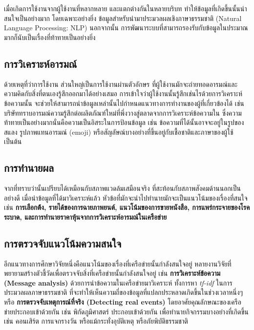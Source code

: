 \section{\SDA}

เมื่อเกิดการใช้งานจากผู้ใช้งานที่หลากหลาย และแตกต่างกันในหลายบริบท 
ทำให้ข้อมูลที่เกิดขึ้นนั้นน่าสนใจเป็นอย่างมาก โดยเฉพาะอย่างยิ่ง 
ข้อมูลสำหรับนำมาประมวลผลเชิงภาษาธรรมชาติ (Natural Language Processing: NLP)
นอกจากนั้น การพัฒนาระบบที่สามารถรองรับกับข้อมูลในประมาณมากก็นับเป็นเรื่องที่ท้าทายเป็นอย่างยิ่ง

\subsection{การวิเคราะห์อารมณ์} 
ด้วยเหตุที่ว่าการใช้งาน{\OSN} ส่วนใหญ่เป็นการใช้งานผ่านตัวอักษร 
ที่ผู้ใช้งานมักจะถ่ายทอดอารมณ์และความคิดกับสิ่งที่ตนเองรู้สึกออกมาได้อย่างเสมอ
การเข้าใจว่าผู้ใช้งานนั้นรู้สึกเช่นไรด้วยการวิเคราะห์ข้อความนั้น 
จะช่วยให้สามารถนำข้อมูลเหล่านั้นไปกำหนดแนวทางการทำงานของผู้ที่เกี่ยวข้องได้ เช่น 
บริษัททราบอารมณ์ความรู้สึกต่อผลิตภัณฑ์ใหม่ที่พึ่งวางสู่ตลาดจากการวิเคราะห์ข้อความใน{\OSN} 
ซึ่งความท้าทายเป็นอย่างมากนั่นคือความเป็นอิสระในการป้อนข้อมูล เช่น 
ข้อความที่ได้นั้นอาจจะอยู่ในรูปของสแลง รูปภาพแทนอารมณ์ (emoji) 
หรือสัญลัษณ์บางอย่างที่ขึ้นอยู่กับเชื้อชาติและภาษาของผู้ใช้ เป็นต้น

\subsection{การทำนายผล}
จากที่ทราบว่า{\OSN}นั้นเปรียบได้เหมือนกับสภาพแวดล้มเสมือนจริง 
ที่สะท้อนกับสภาพสังคมด้านนอกเป็นอย่างดี เมื่อนำข้อมูลที่ได้มาวิเคราะห์แล้ว 
หัวข้อที่มักจะนำไปทำนายมักจะเป็นแนวโน้มของเรื่องที่สนใจ เช่น 
\textbf{
    การเลือกต้้ง, รายได้ของการฉายภาพยนต์, แนวโน้มของการขายหนังสือ, 
    การแพร่กระจายของโรคระบาด, 
    และการทำนายราคาหุ้นจากการวิเคราะห์อารมณ์ในเครือข่าย}

\subsection{การตรวจจับแนวโน้มความสนใจ}
อีกแนวทางการศึกษาวิจัยหนึ่งคือแนวโน้มของเรื่องที่เครือข่ายนั้นกำลังสนใจอยู่ 
หลายงานวิจัยที่พยายามสร้างตัวชี้วัดเพื่อตรวจจับสิ่งที่เครือข่ายนั้นกำลังสนใจอยู่ เช่น 
\textbf{การวิเคราะห์ข้อความ (Message analysis)} ด้วยการนำข้อความในเครือข่ายมาวิเคราะห์
ทั้งการหา \textit{tf-idf} ในการประมวลผลภาษาธรรมชาติ 
ที่จะทำให้เห็นความถี่ของข้อมูลที่แปลกประหลาดเกิดขึ้นในช่วงเวลาหนึ่งๆ 
หรือ \textbf{การตรวจจับเหตุการณ์ที่จริง (Detecting real events)} 
โดยอาศัยคุณลักษณะของเครือข่ายประกอบเข้าด้วยกัน เช่น พิกัดภูมิศาสตร์ ประกอบเข้าด้วยกัน
เพื่อทำนายกิจกรรมบางอย่างที่เกิดขึ้น เช่น คอนเสิร์ต การแจกรางวัน 
หรือแม้กระทั่งอุบัติเหตุ หรือภัยพิบัติธรรมชาติ

